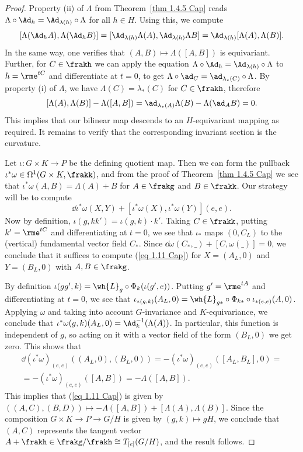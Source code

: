 \begin{proof}
    Property (ii) of $\Lambda$ from Theorem~\ref{thm 1.4.5 Cap} reads $\Lambda\circ\Ad_h=\Ad_{\lambda(h)}\circ\Lambda$ for all $h\in H$. Using this, we compute 
    \[[\Lambda(\Ad_h A),\Lambda(\Ad_h B)]=[\Ad_{\lambda(h)}\Lambda(A),\Ad_{\lambda(h)}\Lambda B]=\Ad_{\lambda(h)}[\Lambda(A),\Lambda(B)].\]
    In the same way, one verifies that $(A,B)\mapsto \Lambda([A,B])$ is equivariant. Further, for $C\in\frakh$ we can apply the equation $\Lambda\circ \Ad_h=\Ad_{\lambda(h)}\circ \Lambda$ to $h=\rme^{tC}$ and differentiate at $t=0$, to get $\Lambda\circ\ad_C=\ad_{\lambda_\ast(C)}\circ\Lambda$. By property (i) of $\Lambda$, we have $\Lambda(C)=\lambda_\ast(C)$ for $C\in\frakh$, therefore 
    \[[\Lambda(A),\Lambda(B)]-\Lambda([A,B])=\ad_{\lambda_\ast(A)}\Lambda(B)-\Lambda(\ad_A B)=0.\]
    This implies that our bilinear map descends to an $H$-equivariant mapping as required. It remains to verify that the corresponding invariant section is the curvature.

    Let $\iota:G\times K\to P$ be the defining quotient map. Then we can form the pullback $\iota^\ast\omega\in\Omega^1(G\times K,\frakk)$, and from the proof of Theorem~\ref{thm 1.4.5 Cap} we see that $\iota^\ast\omega(A,B)=\Lambda(A)+B$ for $A\in\frakg$ and $B\in\frakk$. Our strategy will be to compute 
    \[\dd\iota^\ast\omega(X,Y)+[\iota^\ast\omega(X),\iota^\ast\omega(Y)](e,e).\label{eq 1.11 Cap}\]
    Now by definition, $\iota(g,kk')=\iota(g,k)\cdot k'$. Taking $C\in\frakk$, putting $k'=\rme^{tC}$ and differentiating at $t=0$, we see that $\iota_\ast$ maps $(0,C_L)$ to the (vertical) fundamental vector field $C_\ast$. Since $\dd\omega(C_\ast,\_)+[C,\omega(\_)]=0$, we conclude that it suffices to compute (\ref{eq 1.11 Cap}) for $X=(A_L,0)$ and $Y=(B_L,0)$ with $A,B\in\frakg$.

    By definition $\iota(gg',k)=\wh{L}_g\circ \Phi_k(\iota(g',e))$. Putting $g'=\rme^{tA}$ and differentiating at $t=0$, we see that $\iota_{\ast(g,k)}(A_L,0)=\wh{L}_{g\ast}\circ \Phi_{k\ast}\circ \iota_{\ast(e,e)}(A,0)$. Applying $\omega$ and taking into account $G$-invariance and $K$-equivariance, we conclude that $\iota^\ast\omega(g,k)(A_L,0)=\Ad_k^{-1}(\Lambda(A))$. In particular, this function is independent of $g$, so acting on it with a vector field of the form $(B_L,0)$ we get zero. This shows that
    \begin{multline}
        \dd(\iota^\ast\omega)_{(e,e)}((A_L,0),(B_L,0))=-(\iota^\ast\omega)_{(e,e)}([A_L,B_L],0)=\\
        =-(\iota^\ast \omega)_{(e,e)}([A,B])=-\Lambda([A,B]).
    \end{multline}
    This implies that (\ref{eq 1.11 Cap}) is given by $((A,C),(B,D))\mapsto -\Lambda([A,B])+[\Lambda(A),\Lambda(B)]$. Since the composition $G\times K\to P\to G\slash H$ is given by $(g,k)\mapsto gH$, we conclude that $(A,C)$ represents the tangent vector $A+\frakh\in\frakg\slash\frakh\cong T_{[e]}(G\slash H)$, and the result follows.
\end{proof}


